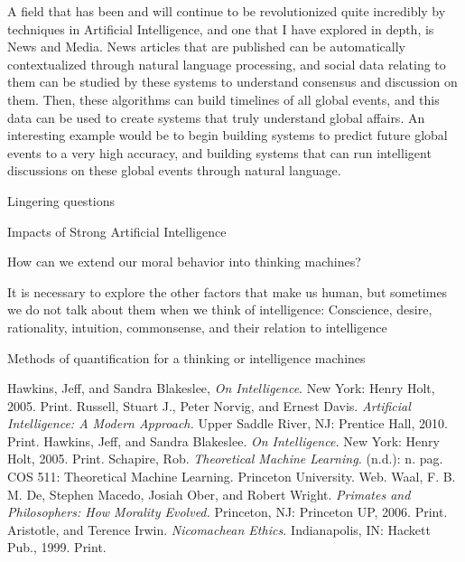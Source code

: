 \documentclass[11pt]{article}
\begin{document}
\par A field that has been and will continue to be revolutionized quite incredibly by techniques in Artificial Intelligence, and one that I have explored in depth, is News and Media. News articles that are published can be automatically contextualized through natural language processing, and social data relating to them can be studied by these systems to understand consensus and discussion on them. Then, these algorithms can build timelines of all global events, and this data can be used to create systems that truly understand global affairs. An interesting example would be to begin building systems to predict future global events to a very high accuracy, and building systems that can run intelligent discussions on these global events through natural language.

\begin{center}
	{\large Lingering questions\par}
\end{center}

\par Impacts of Strong Artificial Intelligence
\par How can we extend our moral behavior into thinking machines?
\par It is necessary to explore the other factors that make us human, but sometimes we do not talk about them when we think of intelligence: Conscience, desire, rationality, intuition, commonsense, and their relation to intelligence
\par Methods of quantification for a thinking or intelligence machines

\newpage

\begin{thebibliography}{9}
	Hawkins, Jeff, and Sandra Blakeslee,
	\emph{On Intelligence}.
	New York: Henry Holt, 2005.
	Print.
	Russell, Stuart J., Peter Norvig, and Ernest Davis.
	\emph{Artificial Intelligence: A Modern Approach.}
	Upper Saddle River, NJ: Prentice Hall, 2010.
	Print.
	Hawkins, Jeff, and Sandra Blakeslee.
	\emph{On Intelligence.}
	New York: Henry Holt, 2005. Print.
	Schapire, Rob.
	\emph{Theoretical Machine Learning.} 
	(n.d.): n. pag. COS 511: Theoretical Machine Learning. Princeton University.
	Web.
	Waal, F. B. M. De, Stephen Macedo, Josiah Ober, and Robert Wright.
	\emph{Primates and Philosophers: How Morality Evolved.}
	Princeton, NJ: Princeton UP, 2006.
	Print.
	Aristotle, and Terence Irwin.
	\emph{Nicomachean Ethics.}
	Indianapolis, IN: Hackett Pub., 1999.
	Print.
\end{thebibliography}
\end{document}
